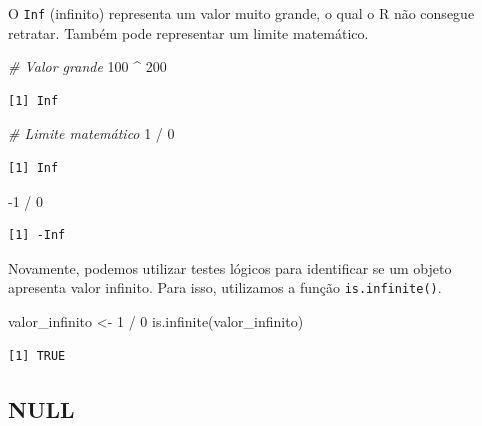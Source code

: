 \documentclass[
  brazilian,
]{book}
\newenvironment{Shaded}{\begin{snugshade}}{\end{snugshade}}
\newcommand{\CommentTok}[1]{\textcolor[rgb]{0.56,0.35,0.01}{\textit{#1}}}
\newcommand{\DecValTok}[1]{\textcolor[rgb]{0.00,0.00,0.81}{#1}}
\newcommand{\FunctionTok}[1]{\textcolor[rgb]{0.00,0.00,0.00}{#1}}
\newcommand{\NormalTok}[1]{#1}
\newcommand{\OtherTok}[1]{\textcolor[rgb]{0.56,0.35,0.01}{#1}}
\newcommand{\SpecialCharTok}[1]{\textcolor[rgb]{0.00,0.00,0.00}{#1}}
\begin{document}
O \texttt{Inf} (infinito) representa um valor muito grande, o qual o R não consegue retratar. Também pode representar um limite matemático.

\begin{Shaded}
\begin{Highlighting}[]
\CommentTok{\# Valor grande}
\DecValTok{100} \SpecialCharTok{\^{}} \DecValTok{200}
\end{Highlighting}
\end{Shaded}

\begin{verbatim}
[1] Inf
\end{verbatim}

\begin{Shaded}
\begin{Highlighting}[]
\CommentTok{\# Limite matemático}
\DecValTok{1} \SpecialCharTok{/} \DecValTok{0}
\end{Highlighting}
\end{Shaded}

\begin{verbatim}
[1] Inf
\end{verbatim}

\begin{Shaded}
\begin{Highlighting}[]
\SpecialCharTok{{-}}\DecValTok{1} \SpecialCharTok{/} \DecValTok{0}
\end{Highlighting}
\end{Shaded}

\begin{verbatim}
[1] -Inf
\end{verbatim}

Novamente, podemos utilizar testes lógicos para identificar se um objeto apresenta valor infinito. Para isso, utilizamos a função \texttt{is.infinite()}.

\begin{Shaded}
\begin{Highlighting}[]
\NormalTok{valor\_infinito }\OtherTok{\textless{}{-}} \DecValTok{1} \SpecialCharTok{/} \DecValTok{0}
\FunctionTok{is.infinite}\NormalTok{(valor\_infinito)}
\end{Highlighting}
\end{Shaded}

\begin{verbatim}
[1] TRUE
\end{verbatim}

\hypertarget{null}{%
\subsection{NULL}\label{null}}
\end{document}
